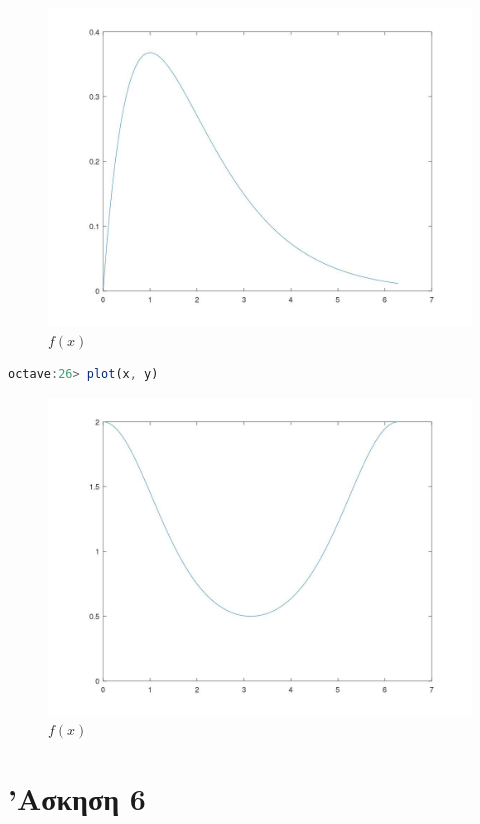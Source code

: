 \documentclass{article}
\begin{document}
\begin{figure}[H]
        \centering
        \includegraphics[width=\linewidth]{res/fig4.jpg}
        \caption{$f(x)$}
\end{figure}

\begin{lstlisting}[language=octave]
        octave:26> plot(x, y)
\end{lstlisting}

\begin{figure}[H]
        \centering
        \includegraphics[width=\linewidth]{res/fig5.jpg}
        \caption{$f(x)$}
\end{figure}

\section{'Ασκηση 6}
\end{document}
